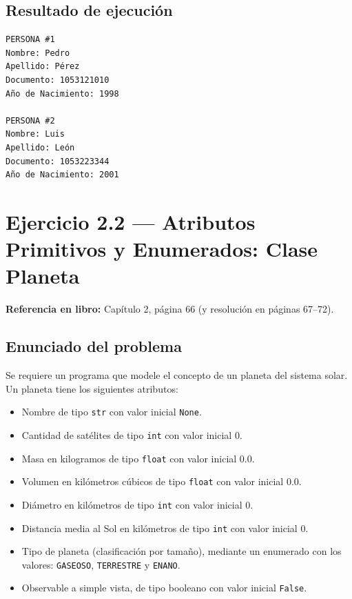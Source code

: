 \documentclass[11pt,a4paper]{article}
\begin{document}
\subsection{Resultado de ejecución}
\begin{verbatim}
PERSONA #1
Nombre: Pedro
Apellido: Pérez
Documento: 1053121010
Año de Nacimiento: 1998

PERSONA #2
Nombre: Luis
Apellido: León
Documento: 1053223344
Año de Nacimiento: 2001
\end{verbatim}

\newpage

\section{Ejercicio 2.2 — Atributos Primitivos y Enumerados: Clase Planeta}
\textbf{Referencia en libro:} Capítulo 2, página 66 (y resolución en páginas 67--72).

\subsection{Enunciado del problema}
Se requiere un programa que modele el concepto de un planeta del sistema solar. Un planeta tiene los siguientes atributos:
\begin{itemize}
    \item Nombre de tipo \texttt{str} con valor inicial \texttt{None}.
    \item Cantidad de satélites de tipo \texttt{int} con valor inicial $0$.
    \item Masa en kilogramos de tipo \texttt{float} con valor inicial $0.0$.
    \item Volumen en kilómetros cúbicos de tipo \texttt{float} con valor inicial $0.0$.
    \item Diámetro en kilómetros de tipo \texttt{int} con valor inicial $0$.
    \item Distancia media al Sol en kilómetros de tipo \texttt{int} con valor inicial $0$.
    \item Tipo de planeta (clasificación por tamaño), mediante un enumerado con los valores: \texttt{GASEOSO}, \texttt{TERRESTRE} y \texttt{ENANO}.
    \item Observable a simple vista, de tipo booleano con valor inicial \texttt{False}.
\end{itemize}
\end{document}
